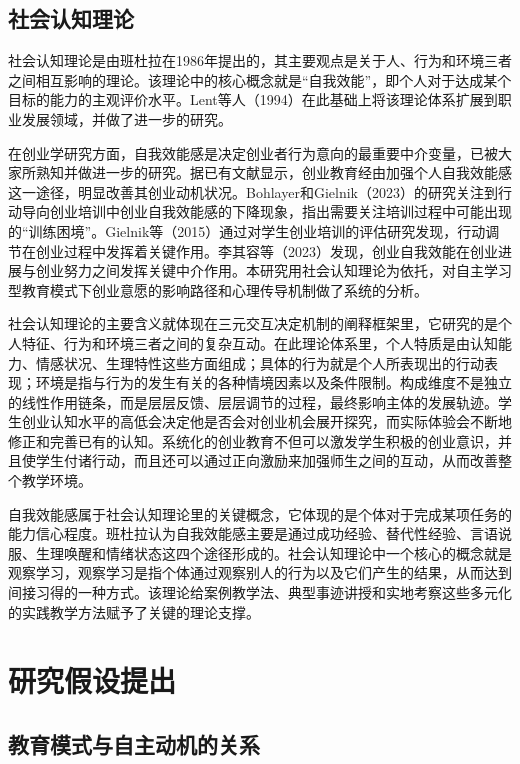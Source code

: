 \subsection{社会认知理论}

社会认知理论是由班杜拉在1986年提出的，其主要观点是关于人、行为和环境三者之间相互影响的理论\cite{Bandura1986}。该理论中的核心概念就是\nolinebreak[3]“自我效能”，即个人对于达成某个目标的能力的主观评价水平。Lent等人\nolinebreak[3]（1994）在此基础上将该理论体系扩展到职业发展领域，并做了进一步的研究\cite{Lent1994}。

在创业学研究方面，自我效能感是决定创业者行为意向的最重要中介变量，已被大家所熟知并做进一步的研究。据已有文献显示，创业教育经由加强个人自我效能感这一途径，明显改善其创业动机状况。Bohlayer和Gielnik\nolinebreak[3]（2023）的研究关注到行动导向创业培训中创业自我效能感的下降现象，指出需要关注培训过程中可能出现的\nolinebreak[3]“训练困境”\cite{Bohlayer2023}。Gielnik等\nolinebreak[3]（2015）通过对学生创业培训的评估研究发现，行动调节在创业过程中发挥着关键作用\cite{Gielnik2015}。李其容等\nolinebreak[3]（2023）发现，创业自我效能在创业进展与创业努力之间发挥关键中介作用\cite{liqirong2023}。本研究用社会认知理论为依托，对自主学习型教育模式下创业意愿的影响路径和心理传导机制做了系统的分析。

社会认知理论的主要含义就体现在三元交互决定机制的阐释框架里，它研究的是个人特征、行为和环境三者之间的复杂互动。在此理论体系里，个人特质是由认知能力、情感状况、生理特性这些方面组成；具体的行为就是个人所表现出的行动表现；环境是指与行为的发生有关的各种情境因素以及条件限制。构成维度不是独立的线性作用链条，而是层层反馈、层层调节的过程，最终影响主体的发展轨迹。学生创业认知水平的高低会决定他是否会对创业机会展开探究，而实际体验会不断地修正和完善已有的认知。系统化的创业教育不但可以激发学生积极的创业意识，并且使学生付诸行动，而且还可以通过正向激励来加强师生之间的互动，从而改善整个教学环境。

自我效能感属于社会认知理论里的关键概念，它体现的是个体对于完成某项任务的能力信心程度。班杜拉认为自我效能感主要是通过成功经验、替代性经验、言语说服、生理唤醒和情绪状态这四个途径形成的。社会认知理论中一个核心的概念就是观察学习，观察学习是指个体通过观察别人的行为以及它们产生的结果，从而达到间接习得的一种方式。该理论给案例教学法、典型事迹讲授和实地考察这些多元化的实践教学方法赋予了关键的理论支撑。

\section{研究假设提出}

\subsection{教育模式与自主动机的关系}

